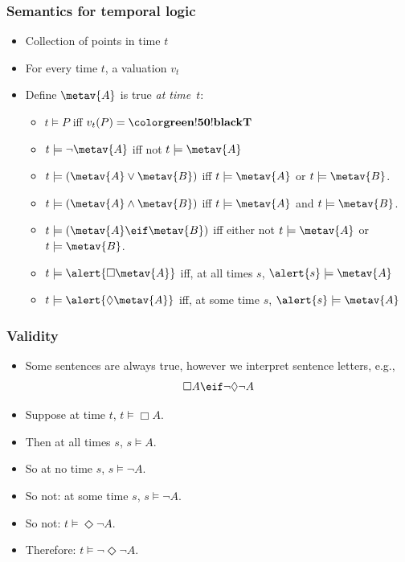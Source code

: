 \begin{frame}
\frametitle{Semantics for temporal logic}

\begin{itemize}[<+->]
  \item Collection of points in time $t$
  \item For every time $t$, a valuation $v_t$
  \item Define $\metav{A}$ is true \emph{at time~$t$}:
  \begin{itemize}
    \item $t \models P$ iff $v_t(P) = \True$
    \item $t \models \lnot \metav{A}$ iff not $t \models \metav{A}$
    \item $t \models (\metav{A} \lor \metav{B})$ iff $t \models
    \metav{A}$ or $t \models \metav{B}$.
    \item $t \models (\metav{A} \land \metav{B})$ iff $t \models
    \metav{A}$ and $t \models \metav{B}$.
    \item $t \models (\metav{A} \eif \metav{B})$ iff either not $t
    \models \metav{A}$ or $t \models \metav{B}$.
    \item $t \models \alert{\Box \metav{A}}$ iff, at \alert{all times $s$}, $\alert{s} \models \metav{A}$
    \item $t \models \alert{\Diamond \metav{A}}$ iff, at \alert{some time $s$}, $\alert{s} \models \metav{A}$
  \end{itemize}
\end{itemize}
\end{frame}

\begin{frame}
  \frametitle{Validity}

  \begin{itemize}[<+->]
    \item Some sentences are always true, however we interpret sentence letters, e.g.,
    \[ \Box A \eif \lnot\Diamond\lnot A\]
    \item Suppose at time $t$, $t \models \Box A$.
    \item Then at all times $s$, $s \models A$.
    \item So at no time $s$, $s \models \lnot A$.
    \item So not: at some time $s$, $s \models \lnot A$.
    \item So not: $t \models \Diamond\lnot A$.
    \item Therefore: $t \models \lnot\Diamond\lnot A$.
  \end{itemize}
\end{frame}

